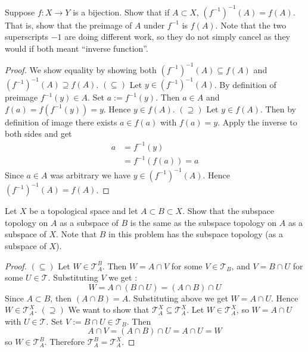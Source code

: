 \documentclass[minion]{homework}
\begin{document}
\begin{problems}

\problem Suppose $f:X\to Y$ is a bijection. Show that if $A\subset X$, $(f^{-1})^{-1}(A)=f(A)$.
That is, show that the preimage of $A$ under $f^{-1}$ is $f(A)$.  Note that the 
two superscripts $-1$ are doing different work, so they do not simply cancel 
as they would if both meant ``inverse function''.
\newline
\begin{proof}
  We show equality by showing both $(f^{-1})^{-1}(A) \subseteq f(A)$ and $(f^{-1})^{-1}(A) \supseteq f(A)$. \newline
  $(\subseteq)$ Let $y \in (f^{-1})^{-1}(A)$. By definition of preimage $f^{-1}(y) \in A$. Set $a := f^{-1}(y)$. Then $ a \in A$ and $f(a) = f(f^{-1}(y)) = y$. Hence $ y \in f(A)$. \newline
  $(\supseteq)$ Let $y \in f(A)$. Then by definition of image there exists $a \in f(a)$ with $f(a) = y$. Apply the inverse to both sides and get
  \begin{align*}
    a &= f^{-1}(y) \\  
      &= f^{-1}(f(a)) = a
  \end{align*}
  Since $a \in A$ was arbitrary we have $y \in (f^{-1})^{-1}(A)$. \newline
  Hence $(f^{-1})^{-1}(A) = f(A)$.
\end{proof}

\problem Let $X$ be a topological space and let $A\subset B\subset X$.
Show that the subspace topology on $A$ as a subspace of $B$ is the same
as the subspace topology on $A$ as a subspace of $X$.  Note that $B$ 
in this problem has the subspace topology (as a subspace of $X$).

\begin{proof}
  $(\subseteq)$ Let $W \in \mathcal{T}_A^B$. Then $W = A \cap V$ for some $V \in \mathcal{T}_B$, and $V = B \cap U$ for some $U \in \mathcal{T}$. Substituting $V$ we get :
  $$W = A \cap (B \cap U) = (A \cap B) \cap U $$
  Since $A \subset B$, then $(A \cap B) = A$. Substituting above we get $W = A \cap U$. Hence $W \in \mathcal{T}_A^X$. \newline
  $(\supseteq)$ We want to show that $\mathcal{T}_A^X \subseteq \mathcal{T}_A^X$. Let $W \in \mathcal{T}_A^X$, so $W = A \cap U$ with $U \in \mathcal{T}$. Set $V := B \cap U \in \mathcal{T}_B$. Then
  $$A \cap V = (A \cap B) \cap U = A \cap U = W$$
  so $W \in \mathcal{T}_A^B$. \newline
  Therefore $\mathcal{T}_A^B = \mathcal{T}_A^X$.
\end{proof}


\end{problems}
\end{document}
